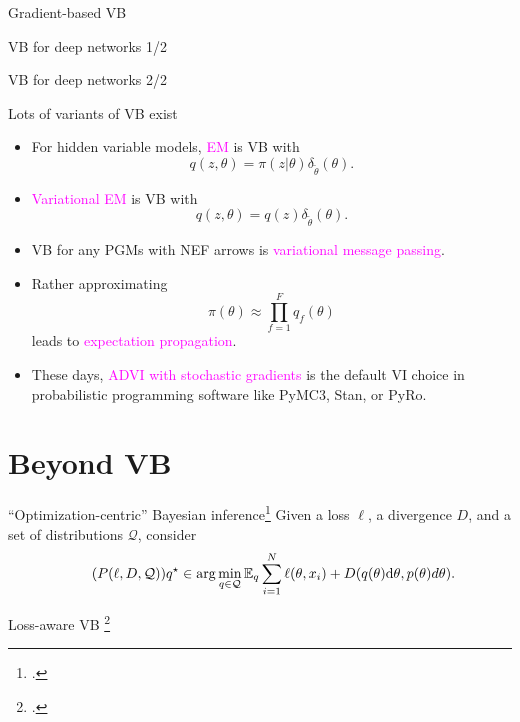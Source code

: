 \documentclass[10pt]{beamer}
\newcommand\un[1]{\textcolor{magenta}{#1}}
\renewcommand\d{\mathrm{d}}
\def\blank{\vspace{.5\textheight}}
\begin{document}
\begin{frame}{Gradient-based VB}
  \vfill
  \blank
\end{frame}

\begin{frame}{VB for deep networks 1/2}
  \vfill
  \blank
\end{frame}

\begin{frame}{VB for deep networks 2/2}
  \vfill
  \blank
\end{frame}

\begin{frame}{Lots of variants of VB exist \citep{Mur12}}
  \begin{itemize}
    \item For hidden variable models, \un{EM} is VB with $$q(z,\theta) = \pi(z\vert \theta)\delta_{\tilde\theta}(\theta).$$
    \item \un{Variational EM} is VB with $$q(z,\theta) = q(z)\delta_{\tilde\theta}(\theta).$$
    \item VB for any PGMs with NEF arrows is \un{variational message passing}.
    \item Rather approximating $$\pi(\theta) \approx \prod_{f=1}^F q_f(\theta)$$ leads to \un{expectation propagation}.
    \item These days, \un{ADVI with stochastic gradients} is the default VI choice in probabilistic programming software like PyMC3, Stan, or PyRo.
  \end{itemize}
\end{frame}

\section{Beyond VB}
\begin{frame}{``Optimization-centric'' Bayesian inference\footcite{KnJeDa22}}
  Given a loss $\ell$, a divergence $D$, and a set of distributions $\mathcal{Q}$, consider\begin{equation}
  \label{e:GVI}
  \tag{$P(\ell, D, \mathcal{Q})$}
  q^\star \in \arg\min_{q\in \mathcal{Q}} \mathbb{E}_q \sum_{i=1}^N \ell(\theta, x_i) + D(q(\theta)\d\theta, p(\theta)d\theta).
\end{equation}
\blank
\end{frame}

\begin{frame}{
  Loss-aware VB \footcite{LaHuGh11}
  }  
\blank
\end{frame}
\end{document}
